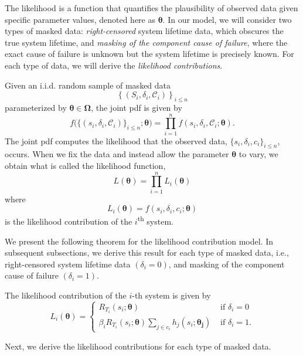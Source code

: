 \documentclass[
]{article}
\begin{document}
The likelihood is a function that quantifies the plausibility of
observed data given specific parameter values, denoted here as
\(\boldsymbol{\theta}\). In our model, we will consider two types of
masked data: \emph{right-censored} system lifetime data, which obscures
the true system lifetime, and \emph{masking of the component cause of
failure}, where the exact cause of failure is unknown but the system
lifetime is precisely known. For each type of data, we will derive the
\emph{likelihood contributions}.

Given an i.i.d. random sample of masked data \[
\left\{(S_i,\delta_i,\mathcal{C}_i)\right\}_{i \leq n}
\] parameterized by \(\boldsymbol{\theta }\in \boldsymbol{\Omega}\), the
joint pdf is given by \[
f\bigl(\{(s_i,\delta_i,\mathcal{C}_i)\}_{i \leq n};\boldsymbol{\theta}\bigr)
    = \prod_{i=1}^n f(s_i,\delta_i,\mathcal{C}_i;\boldsymbol{\theta}).
\] The joint pdf computes the likelihood that the observed data,
\(\{s_i,\delta_i,c_i\}_{i \leq n}\), occurs. When we fix the data and
instead allow the parameter \(\boldsymbol{\theta}\) to vary, we obtain
what is called the likelihood function, \[
L(\boldsymbol{\theta}) = \prod_{i=1}^n L_i(\boldsymbol{\theta})
\] where \[
L_i(\boldsymbol{\theta}) = f(s_i,\delta_i,c_i;\boldsymbol{\theta})
\] is the likelihood contribution of the \(i\)\textsuperscript{th}
system.

We present the following theorem for the likelihood contribution model.
In subsequent subsections, we derive this result for each type of masked
data, i.e., right-censored system lifetime data \((\delta_i = 0)\), and
masking of the component cause of failure \((\delta_i = 1)\).

\begin{theorem}
\label{thm:likelihood_contribution}
The likelihood contribution of the $i$-th system is given by
\begin{equation}
\label{eq:like}
L_i(\boldsymbol{\theta}) =
\begin{cases}
    R_{T_i}(s_i;\boldsymbol{\theta})                      &\text{ if } \delta_i = 0\\
    \beta_i R_{T_i}(s_i;\boldsymbol{\theta})
        \sum_{j\in c_i} h_j(s_i;\boldsymbol{\theta_j})   &\text{ if } \delta_i = 1.
\end{cases}
\end{equation}
\end{theorem}

Next, we derive the likelihood contributions for each type of masked
data.
\end{document}

